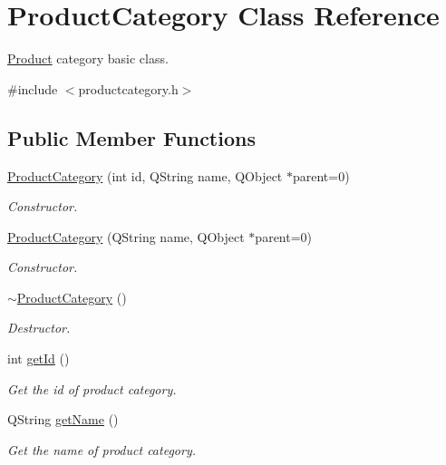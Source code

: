 \hypertarget{class_product_category}{\section{\-Product\-Category \-Class \-Reference}
\label{class_product_category}
}


\hyperlink{class_product}{\-Product} category basic class.  




{\ttfamily \#include $<$productcategory.\-h$>$}

\subsection*{\-Public \-Member \-Functions}
\begin{DoxyCompactItemize}
\item 
\hyperlink{class_product_category_a16a8159bc1de9911c57772f4c02ccdb6}{\-Product\-Category} (int id, \-Q\-String name, \-Q\-Object $\ast$parent=0)
\begin{DoxyCompactList}\small\item\em \-Constructor. \end{DoxyCompactList}\item 
\hyperlink{class_product_category_a0f5cf52042bfde2879b1880b736644df}{\-Product\-Category} (\-Q\-String name, \-Q\-Object $\ast$parent=0)
\begin{DoxyCompactList}\small\item\em \-Constructor. \end{DoxyCompactList}\item 
\hyperlink{class_product_category_a427a031f0b3b0bde73e25202eb77ca59}{$\sim$\-Product\-Category} ()
\begin{DoxyCompactList}\small\item\em \-Destructor. \end{DoxyCompactList}\item 
int \hyperlink{class_product_category_a68e78d3d679bce016ad176f6a9d2eb94}{get\-Id} ()
\begin{DoxyCompactList}\small\item\em \-Get the id of product category. \end{DoxyCompactList}\item 
\-Q\-String \hyperlink{class_product_category_ae98f4789bb865e660a7b0daa66fdda5f}{get\-Name} ()
\begin{DoxyCompactList}\small\item\em \-Get the name of product category. \end{DoxyCompactList}\item 

\end{DoxyCompactItemize}
